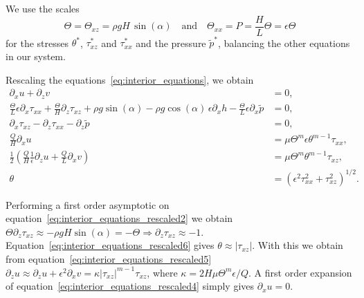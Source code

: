 We use the scales
%
\begin{equation*}
    \Theta = \Theta_{xz} = \rho g H \, \sin (\alpha) \quad \text{and} \quad \Theta_{xx} = P = \frac{H}{L} \Theta = \epsilon \Theta
\end{equation*}
%
for the stresses $\theta^*$, $\tau_{xz}^*$ and $\tau_{xx}^*$ and the pressure $\tilde{p}^*$, balancing the other equations in our system.

Rescaling the equations~\eqref{eq:interior_equations}, we obtain
%
\begin{subequations}
\begin{align}
    \partial_x u + \partial_z v &= 0, \label{eq:interior_equations_rescaled1}\\
    \frac{\Theta}{L} \epsilon \partial_x \tau_{xx} + \frac{\Theta}{H} \partial_z \tau_{xz} + \rho g \sin(\alpha) - \rho g \cos(\alpha) \, \epsilon \partial_x h - \frac{\Theta}{L} \epsilon \partial_x \tilde{p} &= 0, \label{eq:interior_equations_rescaled2}\\
    \partial_x \tau_{xz} - \partial_z \tau_{xx} - \partial_z \tilde{p} &= 0, \label{eq:interior_equations_rescaled3}\\
    \frac{Q}{H} \partial_x u &= \mu \Theta^m \epsilon \theta^{m-1} \tau_{xx}, \label{eq:interior_equations_rescaled4}\\
    \frac{1}{2}(\frac{Q}{H} \frac{1}{\epsilon} \partial_z u + \frac{Q}{L} \partial_x v) &= \mu \Theta^m \theta^{m-1} \tau_{xz}, \label{eq:interior_equations_rescaled5}\\
    \theta &= \left( \epsilon^2 \tau_{xx}^2 + \tau_{xz}^2 \right)^{1/2}. \label{eq:interior_equations_rescaled6}
\end{align}
\label{eq:interior_equations_rescaled}
\end{subequations}

Performing a first order asymptotic on equation~\eqref{eq:interior_equations_rescaled2} we obtain $\Theta \partial_z \tau_{xz} \approx - \rho g H \sin(\alpha) = - \Theta \Rightarrow \partial_z \tau_{xz} \approx -1$. Equation~\eqref{eq:interior_equations_rescaled6} gives $\theta \approx |\tau_{xz}|$. With this we obtain from equation~\eqref{eq:interior_equations_rescaled5} $\partial_z u \approx \partial_z u + \epsilon^2 \partial_x v = \kappa |\tau_{xz}|^{m-1} \tau_{xz}$, where $\kappa = 2H \mu \Theta^m \epsilon / Q$. A first order expansion of equation~\eqref{eq:interior_equations_rescaled4} simply gives $\partial_x u = 0$.
